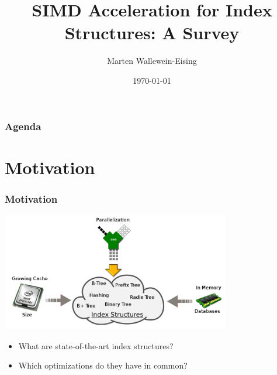 \documentclass{beamer}
\title{SIMD Acceleration for Index Structures: A Survey}
\author{Marten Wallewein-Eising}
\date{\today}
\institute{Otto von Guericke University, Magdeburg}
\begin{document}
\begin{frame}[plain]
 \titlepage
\end{frame}

\section[Agenda]{}
\begin{frame}
\frametitle{Agenda}
\tableofcontents
\end{frame}

\section{Motivation}
\begin{frame}
\frametitle{Motivation}
	\begin{center}
		\includegraphics[width=0.75\textwidth]{img/big_picture.pdf}
	\end{center}
	\begin{itemize}
		\item What are state-of-the-art index structures?
		\item Which optimizations do they have in common?
	\end{itemize}
\end{frame}
\end{document}

